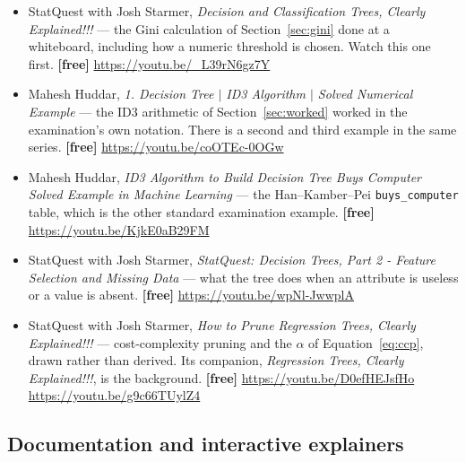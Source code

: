 \documentclass[11pt]{article}
\begin{document}
\begin{itemize}[leftmargin=*]
  \item StatQuest with Josh Starmer, \emph{Decision and Classification Trees,
    Clearly Explained!!!} --- the Gini calculation of
    Section~\ref{sec:gini} done at a whiteboard, including how a numeric
    threshold is chosen. Watch this one first. \textbf{[free]}
    \url{https://youtu.be/_L39rN6gz7Y}
  \item Mahesh Huddar, \emph{1. Decision Tree $\vert$ ID3 Algorithm $\vert$
    Solved Numerical Example} --- the ID3 arithmetic of
    Section~\ref{sec:worked} worked in the examination's own notation. There
    is a second and third example in the same series. \textbf{[free]}
    \url{https://youtu.be/coOTEc-0OGw}
  \item Mahesh Huddar, \emph{ID3 Algorithm to Build Decision Tree Buys
    Computer Solved Example in Machine Learning} --- the Han--Kamber--Pei
    \texttt{buys\_computer} table, which is the other standard examination
    example. \textbf{[free]} \url{https://youtu.be/KjkE0aB29FM}
  \item StatQuest with Josh Starmer, \emph{StatQuest: Decision Trees, Part 2 -
    Feature Selection and Missing Data} --- what the tree does when an
    attribute is useless or a value is absent. \textbf{[free]}
    \url{https://youtu.be/wpNl-JwwplA}
  \item StatQuest with Josh Starmer, \emph{How to Prune Regression Trees,
    Clearly Explained!!!} --- cost-complexity pruning and the $\alpha$ of
    Equation~\eqref{eq:ccp}, drawn rather than derived. Its companion,
    \emph{Regression Trees, Clearly Explained!!!}, is the background.
    \textbf{[free]} \url{https://youtu.be/D0efHEJsfHo} \\
    \url{https://youtu.be/g9c66TUylZ4}
\end{itemize}

\subsection*{Documentation and interactive explainers}
\end{document}
